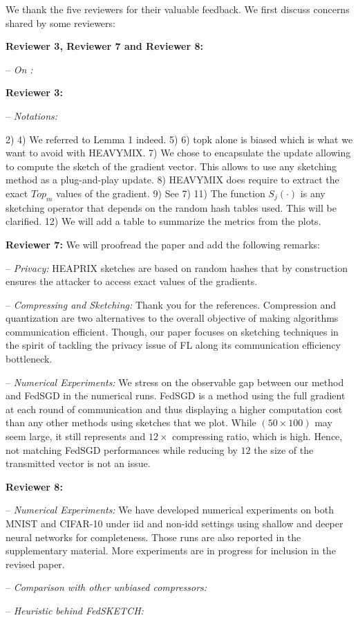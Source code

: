\documentclass{article}
\begin{document}
We thank the five reviewers for their valuable feedback. We first discuss concerns shared by some reviewers:
\vspace{-2pt}

\textbf{Reviewer 3, Reviewer 7 and Reviewer 8:} \vspace{-5pt}

-- \textit{On :} 


\textbf{Reviewer 3:} \vspace{-5pt}

-- \textit{Notations:} 

2) 
4) We referred to Lemma 1 indeed.
5) 
6) topk alone is biased which is what we want to avoid with HEAVYMIX.
7) We chose to encapsulate the update allowing to compute the sketch of the gradient vector. This allows to use any sketching method as a plug-and-play update.
8) HEAVYMIX does require to extract the exact $Top_m$ values of the gradient.
9) See 7)
11) The function $S_j(\cdot)$ is any sketching operator that depends on the random hash tables used. This will be clarified.
12) We will add a table to summarize the metrics from the plots.




\textbf{Reviewer 7:} We will proofread the paper and add the following remarks:\vspace{-5pt}

-- \textit{Privacy:} HEAPRIX sketches are based on random hashes that by construction ensures the attacker to access exact values of the gradients.

-- \textit{Compressing and Sketching:} Thank you for the references.
Compression and quantization are two alternatives to the overall objective of making algorithms communication efficient.
Though, our paper focuses on sketching techniques in the spirit of tackling the privacy issue of FL along its communication efficiency bottleneck.


-- \textit{Numerical Experiments:} 
We stress on the observable gap between our method and FedSGD in the numerical runs. FedSGD is a method using the full gradient at each round of communication and thus displaying a higher computation cost than any other methods using sketches that we plot.
While $(50 \times 100)$ may seem large, it still represents and $12 \times$ compressing ratio, which is high. 
Hence, not matching FedSGD performances while reducing by $12$ the size of the transmitted vector is not an issue.

\textbf{Reviewer 8:} \vspace{-5pt}

-- \textit{Numerical Experiments:} We have developed numerical experiments on both MNIST and CIFAR-10 under iid and non-idd settings using shallow and deeper neural networks for completeness. Those runs are also reported in the supplementary material.
More experiments are in progress for inclusion in the revised paper.

-- \textit{Comparison with other unbiased compressors:} 

-- \textit{Heuristic behind FedSKETCH:} 
\end{document}
